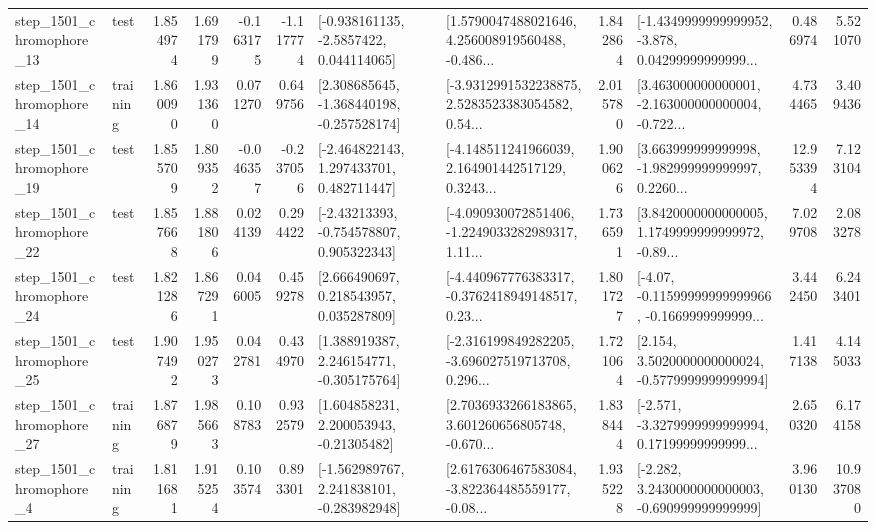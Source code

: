\begin{tabular}{llrrrrllrlrr}
 step\_1501\_chromophore\_13 &      test &      1.854974 &    1.691799 &     -0.163175 & -1.117774 &     [-0.938161135, -2.5857422, 0.044114065] &  [1.5790047488021646, 4.256008919560488, -0.486... &       1.842864 &  [-1.4349999999999952, -3.878, 0.04299999999999... &            0.486974 &          5.521070 \\
 step\_1501\_chromophore\_14 &  training &      1.860090 &    1.931360 &      0.071270 &  0.649756 &   [2.308685645, -1.368440198, -0.257528174] &  [-3.9312991532238875, 2.5283523383054582, 0.54... &       2.015780 &  [3.463000000000001, -2.163000000000004, -0.722... &            4.734465 &          3.409436 \\
 step\_1501\_chromophore\_19 &      test &      1.855709 &    1.809352 &     -0.046357 & -0.237056 &    [-2.464822143, 1.297433701, 0.482711447] &  [-4.148511241966039, 2.164901442517129, 0.3243... &       1.900626 &  [3.663999999999998, -1.982999999999997, 0.2260... &           12.953394 &          7.123104 \\
 step\_1501\_chromophore\_22 &      test &      1.857668 &    1.881806 &      0.024139 &  0.294422 &    [-2.43213393, -0.754578807, 0.905322343] &  [-4.090930072851406, -1.2249033282989317, 1.11... &       1.736591 &  [3.8420000000000005, 1.1749999999999972, -0.89... &            7.029708 &          2.083278 \\
 step\_1501\_chromophore\_24 &      test &      1.821286 &    1.867291 &      0.046005 &  0.459278 &     [2.666490697, 0.218543957, 0.035287809] &  [-4.440967776383317, -0.3762418949148517, 0.23... &       1.801727 &  [-4.07, -0.11599999999999966, -0.1669999999999... &            3.442450 &          6.243401 \\
 step\_1501\_chromophore\_25 &      test &      1.907492 &    1.950273 &      0.042781 &  0.434970 &    [1.388919387, 2.246154771, -0.305175764] &  [-2.316199849282205, -3.696027519713708, 0.296... &       1.721064 &   [2.154, 3.5020000000000024, -0.5779999999999994] &            1.417138 &          4.145033 \\
 step\_1501\_chromophore\_27 &  training &      1.876879 &    1.985663 &      0.108783 &  0.932579 &     [1.604858231, 2.200053943, -0.21305482] &  [2.7036933266183865, 3.601260656805748, -0.670... &       1.838444 &  [-2.571, -3.3279999999999994, 0.17199999999999... &            2.650320 &          6.174158 \\
  step\_1501\_chromophore\_4 &  training &      1.811681 &    1.915254 &      0.103574 &  0.893301 &   [-1.562989767, 2.241838101, -0.283982948] &  [2.6176306467583084, -3.822364485559177, -0.08... &       1.935228 &   [-2.282, 3.2430000000000003, -0.690999999999999] &            3.960130 &         10.937080 \\

\end{tabular}
